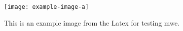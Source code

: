 \begin{figure}[]
    \centering
    \texttt{[image: example-image-a]}
    \caption[Short Title for My Example Figure]{This is an example image from the Latex for testing mwe. \blindtext}
    \label{fig:example-a}
\end{figure}

\endinput